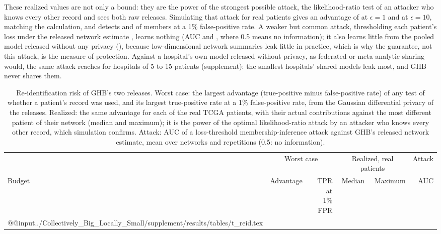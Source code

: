 These realized values are not only a bound: they are the power of the strongest possible attack, the likelihood-ratio test of an attacker who knows every other record and sees both raw releases. Simulating that attack for \SimReidLRPatients{} real patients gives an advantage of \SimReidOneLRAdv{} at $\epsilon=1$ and \SimReidTenLRAdv{} at $\epsilon=10$, matching the calculation, and detects \SimReidOneLRTpr{} and \SimReidTenLRTpr{} of members at a 1\% false-positive rate. A weaker but common attack, thresholding each patient's loss under the released network estimate \cite{shokri2017membership}, learns nothing (AUC \SimReidOneGHBAuc{} and \SimReidTenGHBAuc, where 0.5 means no information); it also learns little from the pooled model released without any privacy (\SimReidPooledAuc), because low-dimensional network summaries leak little in practice, which is why the guarantee, not this attack, is the measure of protection. Against a hospital's own model released without privacy, as federated or meta-analytic sharing would, the same attack reaches \SimReidLocSmallAuc{} for hospitals of 5 to 15 patients (supplement): the smallest hospitals' shared models leak most, and GHB never shares them.

\begin{table}[t]
\caption{Re-identification risk of GHB's two releases. Worst case: the largest advantage (true-positive minus false-positive rate) of any test of whether a patient's record was used, and its largest true-positive rate at a 1\% false-positive rate, from the Gaussian differential privacy of the releases. Realized: the same advantage for each of the \SimReidPatients{} real TCGA patients, with their actual contributions against the most different patient of their network (median and maximum); it is the power of the optimal likelihood-ratio attack by an attacker who knows every other record, which simulation confirms. Attack: AUC of a loss-threshold membership-inference attack against GHB's released network estimate, mean over networks and repetitions (0.5: no information).}
\label{tab:reid}
\scriptsize
\begin{tabular}{@{}lrrrrr@{}}
\toprule
 & \multicolumn{2}{c}{Worst case} & \multicolumn{2}{c}{Realized, real patients} & Attack\\
\cmidrule(lr){2-3}\cmidrule(lr){4-5}\cmidrule(l){6-6}
Budget & Advantage & \makecell[r]{TPR at\\1\% FPR} & Median & Maximum & AUC\\
\midrule
\csname @@input\endcsname../Collectively_Big_Locally_Small/supplement/results/tables/t_reid.tex 
\bottomrule
\end{tabular}
\end{table}

